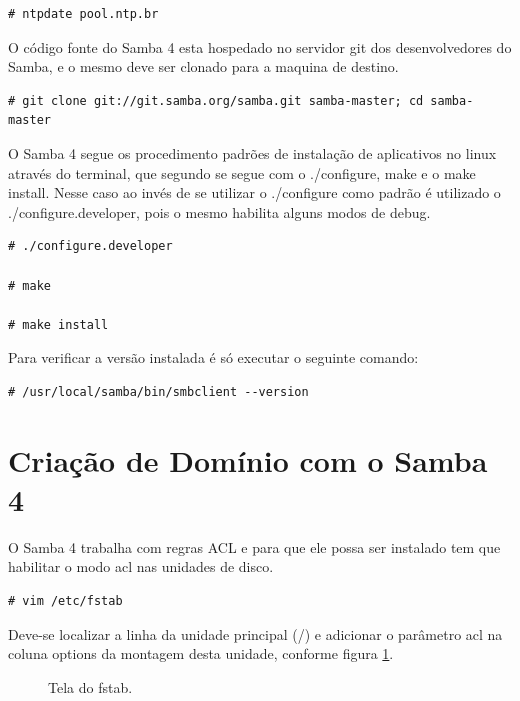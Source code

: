 \begin{lstlisting}
# ntpdate pool.ntp.br
\end{lstlisting}

O código fonte do Samba 4 esta hospedado no servidor git dos desenvolvedores do Samba, e o mesmo deve ser clonado para a maquina de destino.\\

\begin{lstlisting}
# git clone git://git.samba.org/samba.git samba-master; cd samba-master
\end{lstlisting}

O Samba 4 segue os procedimento padrões de instalação de aplicativos no linux através do terminal, que segundo \cite{INSTALL} se segue com o ./configure, make e o make install. Nesse caso ao invés de se utilizar o ./configure como padrão é utilizado o ./configure.developer, pois o mesmo habilita alguns modos de debug.\\

\begin{lstlisting}
# ./configure.developer

# make 

# make install
\end{lstlisting}

Para verificar a versão instalada é só executar o seguinte comando:\\

\begin{lstlisting}
# /usr/local/samba/bin/smbclient --version
\end{lstlisting}

\section{Criação de Domínio com o Samba 4}

O Samba 4 trabalha com regras ACL e para que ele possa ser instalado tem que habilitar o modo acl nas unidades de disco.\\

\begin{lstlisting}
# vim /etc/fstab
\end{lstlisting}

Deve-se localizar a linha da unidade principal (/) e adicionar o parâmetro acl na coluna options da montagem desta unidade, conforme figura \ref{fstab}.

\begin{figure}[ht]
   	\centering
   	\caption{Tela do fstab.}
    \label{fstab}
\end{figure}

